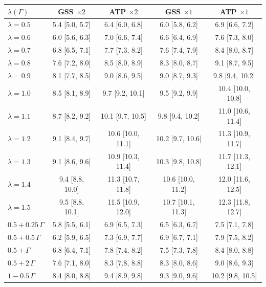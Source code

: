 \begin{tabular}{@{}lcccc@{}}
\toprule
$\lambda(\Gamma)$ & GSS $\times2$ & ATP $\times2$ & GSS $\times1$ & ATP $\times1$ \\
\midrule
$\lambda = 0.5$ & 5.4 [5.0, 5.7] & 6.4 [6.0, 6.8] & 6.0 [5.8, 6.2] & 6.9 [6.6, 7.2] \\
$\lambda = 0.6$ & 6.0 [5.6, 6.3] & 7.0 [6.6, 7.4] & 6.6 [6.4, 6.9] & 7.6 [7.3, 8.0] \\
$\lambda = 0.7$ & 6.8 [6.5, 7.1] & 7.7 [7.3, 8.2] & 7.6 [7.4, 7.9] & 8.4 [8.0, 8.7] \\
$\lambda = 0.8$ & 7.6 [7.2, 8.0] & 8.5 [8.0, 8.9] & 8.3 [8.0, 8.7] & 9.1 [8.7, 9.5] \\
$\lambda = 0.9$ & 8.1 [7.7, 8.5] & 9.0 [8.6, 9.5] & 9.0 [8.7, 9.3] & 9.8 [9.4, 10.2] \\
$\lambda = 1.0$ & 8.5 [8.1, 8.9] & 9.7 [9.2, 10.1] & 9.5 [9.2, 9.9] & 10.4 [10.0, 10.8] \\
$\lambda = 1.1$ & 8.7 [8.2, 9.2] & 10.1 [9.7, 10.5] & 9.8 [9.4, 10.2] & 11.0 [10.6, 11.4] \\
$\lambda = 1.2$ & 9.1 [8.4, 9.7] & 10.6 [10.0, 11.1] & 10.2 [9.7, 10.6] & 11.3 [10.9, 11.7] \\
$\lambda = 1.3$ & 9.1 [8.6, 9.6] & 10.9 [10.3, 11.4] & 10.3 [9.8, 10.8] & 11.7 [11.3, 12.1] \\
$\lambda = 1.4$ & 9.4 [8.8, 10.0] & 11.3 [10.7, 11.8] & 10.6 [10.0, 11.2] & 12.0 [11.6, 12.5] \\
$\lambda = 1.5$ & 9.5 [8.8, 10.1] & 11.5 [10.9, 12.0] & 10.7 [10.1, 11.3] & 12.3 [11.8, 12.7] \\
\midrule
$0.5 + 0.25\,\Gamma$ & 5.8 [5.5, 6.1] & 6.9 [6.5, 7.3] & 6.5 [6.3, 6.7] & 7.5 [7.1, 7.8] \\
$0.5 + 0.5\,\Gamma$ & 6.2 [5.9, 6.5] & 7.3 [6.9, 7.7] & 6.9 [6.7, 7.1] & 7.9 [7.5, 8.2] \\
$0.5 + \Gamma$ & 6.8 [6.4, 7.1] & 7.8 [7.4, 8.2] & 7.5 [7.3, 7.8] & 8.4 [8.0, 8.8] \\
$0.5 + 2\,\Gamma$ & 7.6 [7.1, 8.0] & 8.3 [7.8, 8.8] & 8.3 [8.0, 8.6] & 9.0 [8.6, 9.3] \\
\midrule
$1 - 0.5\,\Gamma$ & 8.4 [8.0, 8.8] & 9.4 [8.9, 9.8] & 9.3 [9.0, 9.6] & 10.2 [9.8, 10.5] \\
\bottomrule
\end{tabular}
